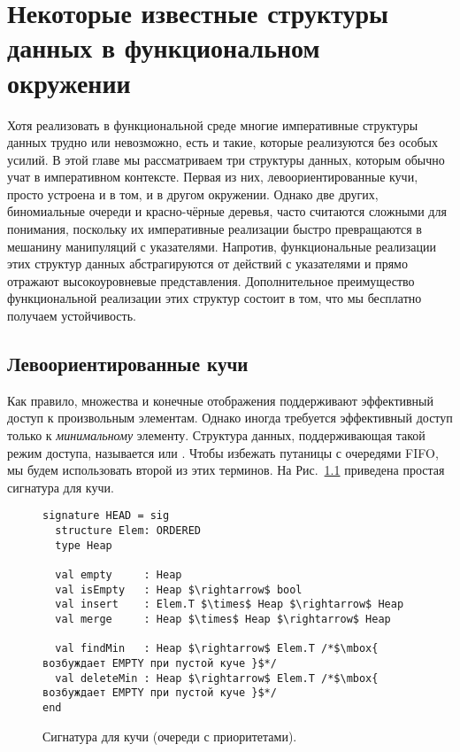 \chapter{Некоторые известные структуры данных в функциональном
  окружении}
\label{ch:3}

Хотя реализовать в функциональной среде многие императивные структуры
данных трудно или невозможно, есть и такие, которые реализуются без
особых усилий.  В этой главе мы рассматриваем три структуры данных,
которым обычно учат в императивном контексте. Первая из них,
левоориентированные кучи, просто устроена и в том, и в другом
окружении. Однако две других, биномиальные очереди и красно-чёрные
деревья, часто считаются сложными для понимания, поскольку
их императивные реализации быстро превращаются в мешанину манипуляций
с указателями.  Напротив, функциональные реализации этих структур
данных абстрагируются от действий с указателями и прямо отражают
высокоуровневые представления. Дополнительное преимущество
функциональной реализации этих структур состоит в том, что мы
бесплатно получаем устойчивость.

\section{Левоориентированные кучи}
\label{sc:3.1}

Как правило, множества и конечные отображения поддерживают эффективный
доступ к произвольным элементам. Однако иногда требуется эффективный
доступ только к \emph{минимальному} элементу.  Структура данных,
поддерживающая такой режим доступа, называется  или .  Чтобы избежать
путаницы с очередями FIFO, мы будем использовать второй из этих
терминов. На Рис.~\ref{fig:3.1} приведена простая сигнатура для кучи.

\begin{figure}
\begin{lstlisting}
signature HEAD = sig
  structure Elem: ORDERED
  type Heap

  val empty     : Heap
  val isEmpty   : Heap $\rightarrow$ bool
  val insert    : Elem.T $\times$ Heap $\rightarrow$ Heap
  val merge     : Heap $\times$ Heap $\rightarrow$ Heap

  val findMin   : Heap $\rightarrow$ Elem.T /*$\mbox{ возбуждает EMPTY при пустой куче }$*/
  val deleteMin : Heap $\rightarrow$ Elem.T /*$\mbox{ возбуждает EMPTY при пустой куче }$*/
end
\end{lstlisting}
\caption{Сигнатура для кучи (очереди с приоритетами).} \label{fig:3.1}
\end{figure}


